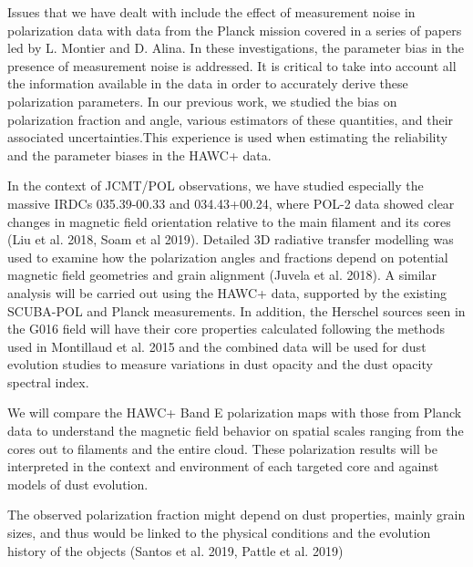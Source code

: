 \documentclass[11pt]{amsart}
\begin{document}
Issues that we have dealt with include the effect of measurement noise in polarization data with data from the Planck mission covered in a series of papers led by L. Montier and D. Alina.
In these investigations, the parameter bias in the presence of measurement noise is addressed. It is critical to take into account all the information available in the data in order to accurately derive these polarization parameters.  In our previous work, we studied the bias on polarization fraction and angle, various estimators of these quantities, and their associated uncertainties.This experience is used when estimating the reliability and the parameter biases in the HAWC+ data.

In the context of JCMT/POL observations, we have studied especially the massive IRDCs 035.39-00.33 and 034.43+00.24, where POL-2 data showed clear changes in magnetic field orientation relative to the main filament and its cores  (Liu et al. 2018, Soam et al 2019). 
Detailed 3D radiative transfer modelling was used to examine  how the polarization angles and fractions depend on potential magnetic field geometries and grain alignment (Juvela et al. 2018).
A similar analysis will be carried out using the HAWC+ data, supported by the existing SCUBA-POL and Planck measurements.
In addition, the Herschel sources seen in the G016 field will have their core properties calculated following the methods used in Montillaud et al. 2015 and the combined data will be used for dust evolution studies
to measure variations in dust opacity and the dust opacity spectral index.

We will compare the HAWC+ Band E  polarization maps with those from Planck data
 to understand the magnetic field behavior on spatial scales ranging from the cores out to filaments and the
entire cloud. These polarization results will be interpreted in the context and environment of each 
targeted core and against models of dust evolution. 

The observed polarization fraction might depend on dust properties, mainly grain sizes, and thus would be linked to 
the physical conditions and the evolution history of the objects (Santos et al. 2019, Pattle et al. 2019)

%
\end{document}
